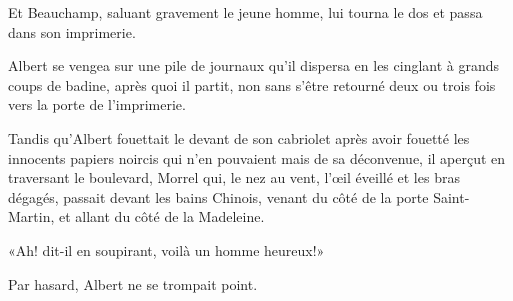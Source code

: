 Et Beauchamp, saluant gravement le jeune homme, lui tourna le dos et passa dans son imprimerie. 

Albert se vengea sur une pile de journaux qu'il dispersa en les cinglant à grands coups de badine, après quoi il partit, non sans s'être retourné deux ou trois fois vers la porte de l'imprimerie. 

Tandis qu'Albert fouettait le devant de son cabriolet après avoir fouetté les innocents papiers noircis qui n'en pouvaient mais de sa déconvenue, il aperçut en traversant le boulevard, Morrel qui, le nez au vent, l'œil éveillé et les bras dégagés, passait devant les bains Chinois, venant du côté de la porte Saint-Martin, et allant du côté de la Madeleine. 

«Ah! dit-il en soupirant, voilà un homme heureux!» 

Par hasard, Albert ne se trompait point. 